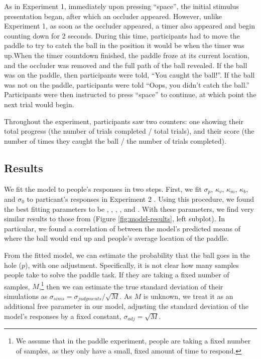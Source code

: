\documentclass[10pt,letterpaper]{article}
\begin{document}
As in Experiment 1, immediately upon pressing ``space'', the initial stimulus presentation began, after which an occluder appeared. However, unlike Experiment 1, as soon as the occluder appeared, a timer also appeared and begin counting down for 2 seconds. During this time, participants had to move the paddle to try to catch the ball in the position it would be when the timer was up.When the timer countdown finished, the paddle froze at its current location, and the occluder was removed and the full path of the ball revealed. If the ball was on the paddle, then participants were told, ``You caught the ball!''. If the ball was not on the paddle, participants were told ``Oops, you didn't catch the ball.'' Participants were then instructed to press ``space'' to continue, at which point the next trial would begin.

Throughout the experiment, participants saw two counters: one showing their total progress (the number of trials completed / total trials), and their score (the number of times they caught the ball / the number of trials completed).

\subsection{Results}
We fit the model to people's responses in two steps. First, we fit $\sigma_p$, $\kappa_v$, $\kappa_m$, $\kappa_b$, and $\sigma_0$ to particant's responses in Experiment 2 \cite<for details, see>{Smith:2013fc}. Using this procedure, we found the best fitting parameters to be \perr{}, \kapv{}, \kapm{}, \kapb{}, and \sdzero{}. With these parameters, we find very similar results to those from  (Figure \ref{fig:model-results}, left subplot). In particular, we found a correlation of \PaddleCorr{} between the model's predicted means of where the ball would end up and people's average location of the paddle.

From the fitted model, we can estimate the probability that the ball goes in the hole ($p$), with one adjustment. Specifically, it is not clear how many samples people take to solve the paddle task. If they are taking a fixed number of samples, $M$,\footnote{We assume that in the paddle experiment, people are taking a fixed number of samples, as they only have a small, fixed amount of time to respond.} then we can estimate the true standard deviation of their simulations as $\sigma_{sims} = \sigma_{judgments} / \sqrt{M}$. As $M$ is unknown, we treat it as an additional free parameter in our model, adjusting the standard deviation of the model's responses by a fixed constant, $\sigma_{adj}=\sqrt{M}$.



\setlength{\bibleftmargin}{.125in}
\setlength{\bibindent}{-\bibleftmargin}


\end{document}
